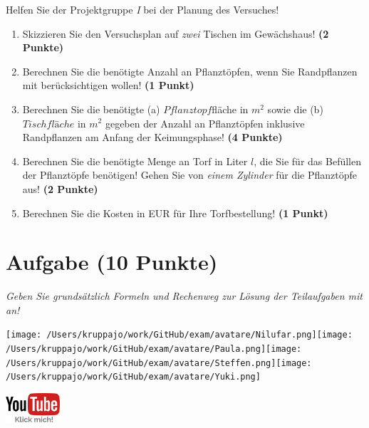 \documentclass[a4paper, 9pt]{scrartcl}\usepackage[]{graphicx}\usepackage[]{xcolor}
\begin{document}
\vspace{1Ex}

Helfen Sie der Projektgruppe \textit{I} bei der Planung des Versuches!

\begin{enumerate}
\item Skizzieren Sie den Versuchsplan auf \textit{zwei} Tischen im Gewächshaus! \textbf{(2 Punkte)}
\item Berechnen Sie die benötigte Anzahl an Pflanztöpfen, wenn Sie Randpflanzen mit berücksichtigen wollen! \textbf{(1 Punkt)}
\item Berechnen Sie die benötigte (a) $Pflanztopf$fläche in $m^2$ sowie die (b) $Tischfläche$ in $m^2$ gegeben der Anzahl an Pflanztöpfen inklusive Randpflanzen am Anfang der Keimungsphase! \textbf{(4 Punkte)}
\item Berechnen Sie die benötigte Menge an Torf in Liter $l$, die Sie für das Befüllen der Pflanztöpfe benötigen! Gehen Sie von \textit{einem Zylinder} für die Pflanztöpfe aus!  \textbf{(2 Punkte)}
\item Berechnen Sie die Kosten in EUR für Ihre Torfbestellung! \textbf{(1 Punkt)}
\end{enumerate}



 
\clearpage

\section{Aufgabe \hfill (10 Punkte)}

\textit{Geben Sie grundsätzlich Formeln und Rechenweg zur Lösung der Teilaufgaben mit an!} \\[1Ex]
 

 
\ifcollection
\begin{flushright}
\tiny\vspace{-3Ex}
\textbf{\examinhaltstart}
\exammodulemathstat
\vspace{-4Ex}
\end{flushright}
\begin{minipage}[t]{0.5\textwidth}
\texttt{[image: /Users/kruppajo/work/GitHub/exam/avatare/Nilufar.png]}\hspace{-4mm}\texttt{[image: /Users/kruppajo/work/GitHub/exam/avatare/Paula.png]}\hspace{-4mm}\texttt{[image: /Users/kruppajo/work/GitHub/exam/avatare/Steffen.png]}\hspace{-4mm}\texttt{[image: /Users/kruppajo/work/GitHub/exam/avatare/Yuki.png]}
\end{minipage}
\begin{minipage}[t]{0.5\textwidth}
\hfill
\href{https://youtu.be/aBxLkdF-c4M}{\includegraphics[width = 2cm]{img/youtube}}
\end{minipage}
\fi
\end{document}
